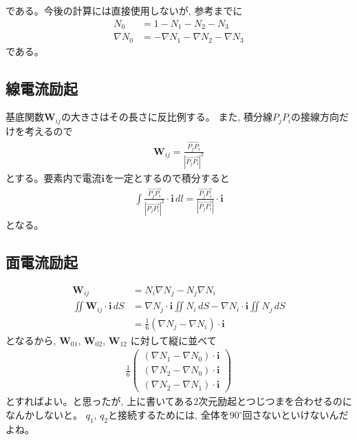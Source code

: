 である。今後の計算には直接使用しないが, 参考までに
\begin{align}
N_0&=1-N_1-N_2-N_3\\
\nabla N_0&=-\nabla N_1-\nabla N_2-\nabla N_3
\end{align}
である。

\subsection{線電流励起}

基底関数$\bm{W}_{ij}$の大きさはその長さに反比例する。
また, 積分線$P_jP_i$の接線方向だけを考えるので
\begin{align}
\bm{W}_{ij}=
\frac{\overrightarrow{P_jP_i}}
     {\left|\overrightarrow{P_jP_i}\right|^2}
\end{align}
とする。要素内で電流$\bm{i}$を一定とするので積分すると
\begin{align}
\int
\frac{\overrightarrow{P_jP_i}}
     {\left|\overrightarrow{P_jP_i}\right|^2}
\cdot\bm{i}\,dl
=\frac{\overrightarrow{P_jP_i}}
      {\left|\overrightarrow{P_jP_i}\right|}
\cdot\bm{i}
\end{align}
となる。

\subsection{面電流励起}

\begin{align}
\bm{W}_{ij}&=N_i\nabla N_j-N_j\nabla N_i\\
\iint\bm{W}_{ij}\cdot\bm{i}\,dS
&=\nabla N_j\cdot\bm{i}\iint N_i\,dS
-\nabla N_i\cdot\bm{i}\iint N_j\,dS\\
&=\frac{1}{6}
\left(\nabla N_j-\nabla N_i\right)\cdot\bm{i}
\end{align}
となるから, $\bm{W}_{01}$, $\bm{W}_{02}$, $\bm{W}_{12}$
に対して縦に並べて
\begin{align}
\frac{1}{6}
\left(
\begin{array}{c}
\left(\nabla N_1-\nabla N_0\right)\cdot\bm{i}\\
\left(\nabla N_2-\nabla N_0\right)\cdot\bm{i}\\
\left(\nabla N_2-\nabla N_1\right)\cdot\bm{i}
\end{array}
\right)
\end{align}
とすればよい。と思ったが,
上に書いてある2次元励起とつじつまを合わせるのになんかしないと。
$q_1$, $q_2$と接続するためには,
全体を$90^\circ$回さないといけないんだよね。

